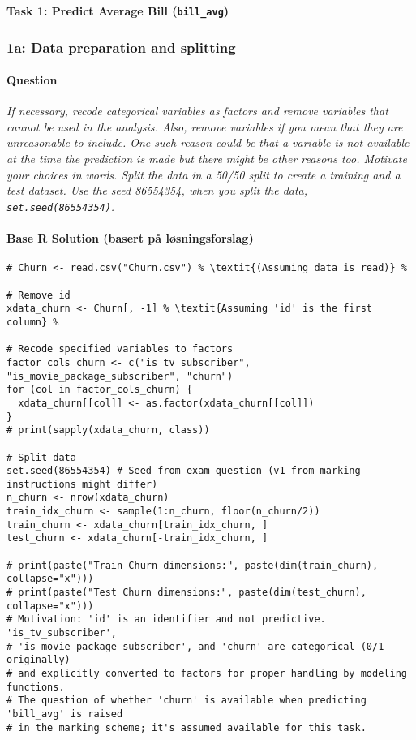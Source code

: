 \documentclass[12pt,a4paper]{article}
\newcommand{\Rcode}[1]{\texttt{#1}} %
\begin{document}
\textbf{\Large Task 1: Predict Average Bill (\Rcode{bill\_avg})}
\vspace{0.5em}

    \subsubsection{1a: Data preparation and splitting}
        \paragraph{Question}
        \textit{If necessary, recode categorical variables as factors and remove variables that cannot be used in the analysis. Also, remove variables if you mean that they are unreasonable to include. One such reason could be that a variable is not available at the time the prediction is made but there might be other reasons too. Motivate your choices in words. Split the data in a 50/50 split to create a training and a test dataset. Use the seed 86554354, when you split the data, \Rcode{set.seed(86554354)}.}
        \paragraph{Base R Solution (basert på løsningsforslag)}
\begin{lstlisting}
# Churn <- read.csv("Churn.csv") % \textit{(Assuming data is read)} %

# Remove id
xdata_churn <- Churn[, -1] % \textit{Assuming 'id' is the first column} %

# Recode specified variables to factors
factor_cols_churn <- c("is_tv_subscriber", "is_movie_package_subscriber", "churn")
for (col in factor_cols_churn) {
  xdata_churn[[col]] <- as.factor(xdata_churn[[col]])
}
# print(sapply(xdata_churn, class))

# Split data
set.seed(86554354) # Seed from exam question (v1 from marking instructions might differ)
n_churn <- nrow(xdata_churn)
train_idx_churn <- sample(1:n_churn, floor(n_churn/2))
train_churn <- xdata_churn[train_idx_churn, ]
test_churn <- xdata_churn[-train_idx_churn, ]

# print(paste("Train Churn dimensions:", paste(dim(train_churn), collapse="x")))
# print(paste("Test Churn dimensions:", paste(dim(test_churn), collapse="x")))
# Motivation: 'id' is an identifier and not predictive. 'is_tv_subscriber', 
# 'is_movie_package_subscriber', and 'churn' are categorical (0/1 originally)
# and explicitly converted to factors for proper handling by modeling functions.
# The question of whether 'churn' is available when predicting 'bill_avg' is raised
# in the marking scheme; it's assumed available for this task.
\end{lstlisting}
\end{document}

